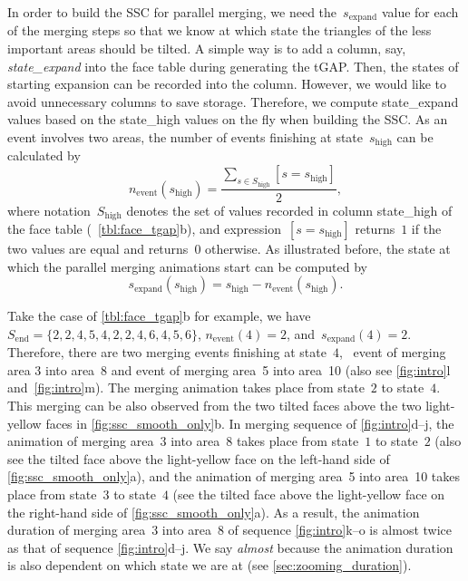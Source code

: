 \documentclass[ijgi,article,submit,moreauthors,pdftex]{Definitions/mdpi}
\begin{document}
In order to build the SSC for parallel merging,
we need the~$s_\mathrm{expand}$ value for each of the merging steps
so that we know at which state 
the triangles of the less important areas should be tilted.
A simple way is to add a column, say, \emph{state\_expand} 
into the face table during generating the tGAP.
Then, the states of starting expansion can be recorded into the column.
However, we would like to avoid unnecessary columns to save storage.
Therefore, we compute state\_expand values 
based on the state\_high values
on the fly when building the SSC.
As an event involves two areas,
the number of events finishing at state~$s_\mathrm{high}$ can be calculated by
\begin{equation}
\label{eq:n_event_state}
n_\mathrm{event} (s_\mathrm{high}) = 
\frac{\sum\limits_{s \in S_\mathrm{high}} [s=s_\mathrm{high}]}{2},
\end{equation}
where notation~$S_\mathrm{high}$ denotes the set of values
recorded in column state\_high of the face table
(\eg~\tbl\ref{tbl:face_tgap}b),
and expression~$[s=s_\mathrm{high}]$ returns~$1$ if the two values are equal 
and returns~$0$ otherwise.
As illustrated before, the state at which the parallel merging animations start 
can be computed by
\begin{equation}
\label{eq:s_expand_state}
s_\mathrm{expand} (s_\mathrm{high}) = s_\mathrm{high} - n_\mathrm{event} (s_\mathrm{high}).
\end{equation}



Take the case of \tbl\ref{tbl:face_tgap}b for example,
we have~$S_\mathrm{end} = \{2, 2, 4, 5, 4, 2, 2, 4, 6, 4, 5, 6\}$, 
$n_\mathrm{event} (4) = 2$, and~$s_\mathrm{expand} (4) = 2$.
Therefore, there are two merging events finishing at state~$4$,
\ie~event of merging area 3 into area~8 and 
event of merging area~5 into area~10 
(also see \figs\ref{fig:intro}l and~\ref{fig:intro}m).
The merging animation takes place from state~$2$ to state~$4$.
This merging can be also observed from 
the two tilted faces above the two light-yellow faces 
in \fig\ref{fig:ssc_smooth_only}b.
In merging sequence of \figs\ref{fig:intro}d--j, 
the animation of merging area~3 into area~8 
takes place from state~$1$ to state~$2$
(also see the tilted face above the light-yellow face 
on the left-hand side of \fig\ref{fig:ssc_smooth_only}a), and 
the animation of merging area~5 into area~10
takes place from state~$3$ to state~$4$
(see the tilted face above the light-yellow face 
on the right-hand side of \fig\ref{fig:ssc_smooth_only}a).
As a result, the animation duration of merging area~3 into area~8 of 
sequence \figs\ref{fig:intro}k--o
is almost twice as that of sequence \figs\ref{fig:intro}d--j.
We say \emph{almost} because the animation duration is also dependent on 
which state we are at
(see \sect\ref{sec:zooming_duration}).
\end{document}
